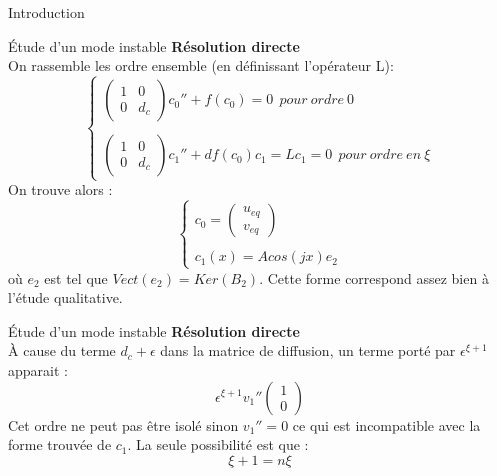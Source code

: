 \documentclass{beamer}
\begin{document}
\begin{frame}{Introduction}
\begin{frame}{\'Etude d'un mode instable}
\textbf{Résolution directe}\\
On rassemble les ordre ensemble (en définissant l'opérateur L): 
\begin{equation}
\left\{
    \begin{array}{ll}
        \begin{pmatrix}
        1 & 0\\
        0 & d_c
        \end{pmatrix} c_0'' + f(c_0) = 0\ \   pour\ ordre\ 0
        \\
        \\
        \begin{pmatrix}
        1 & 0\\
        0 & d_c
        \end{pmatrix} c_1'' + df(c_0)c_1=Lc_1=0\ \   pour\ ordre\ en\ \xi
    \end{array}
\right.
\end{equation}
On trouve alors :
\begin{equation}
\left\{
    \begin{array}{ll}
        c_0 = \begin{pmatrix} u_{eq} \\ v_{eq} \end{pmatrix}
        \\
        \\
        c_1(x) = A cos(jx)e_2
    \end{array}
\right.
\end{equation}
où $e_2$ est tel que $Vect(e_2)=Ker(B_2)$. Cette forme correspond assez bien à l'étude qualitative. 
\end{frame}

\begin{frame}{\'Etude d'un mode instable}
\textbf{Résolution directe}\\
À cause du terme $d_c + \epsilon$ dans la matrice de diffusion, un terme porté par $\epsilon^{\xi +1}$ apparait : 
\begin{equation}
\epsilon^{\xi +1} v_1 ''   \begin{pmatrix}
        1 \\
        0 
        \end{pmatrix} 
\end{equation}
Cet ordre ne peut pas être isolé sinon $v_1 ''=0$ ce qui est incompatible avec la forme trouvée de $c_1$. La seule possibilité est que : 
\begin{equation}
    \xi+1=n\xi
\end{equation}
\end{frame}


\end{frame}
\end{document}
